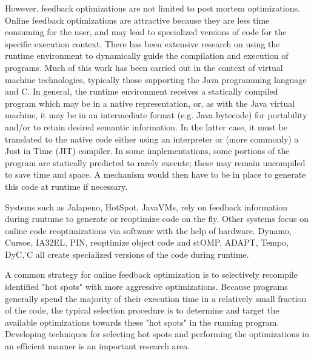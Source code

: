 However, feedback optimizations are not limited to post mortem
optimizations.
Online feedback optimizations are attractive because they are less time consuming for the user, and may lead to specialized versions of code for the specific execution context.
There has been extensive research on using the runtime environment to
dynamically guide the compilation and execution of programs. Much of this work
has been carried out in the context of virtual machine technologies, typically
those supporting the Java programming language and C.  In general, the runtime
environment receives a statically compiled program which may be in a native
representation, or, as with the Java virtual machine, it may be in an
intermediate format (e.g. Java bytecode) for portability and/or to retain
desired semantic information.  In the latter case, it must be translated to
the native code either using an interpreter or (more commonly) a Just in Time
(JIT) compiler.  In some implementations, some portions of the program are
statically predicted to rarely execute; these may remain uncompiled to save
time and space. A mechanism would then have to be in place to generate this
code at runtime if necessary.

Systems such as  Jalapeno\cite{Alpern:2000:JVM:1011388.1011400}, HotSpot, JavaVMs, rely on feedback
information during runtume to generate or reoptimize code on the fly.
Other systems focus on online code reoptimizations via software with the
help of hardware. Dynamo, Cursoe, IA32EL, PIN, reoptimize
object code and stOMP, ADAPT\cite{Voss:2001:HAP:568014.379583}, Tempo, DyC,'C all create specialized versions
of the code during runtime.

A common strategy for online feedback optimization is to selectively recompile
identified "hot spots" with more aggressive optimizations.  Because programs
generally spend the majority of their execution time in a relatively small
fraction of the code, the typical selection procedure is to determine and
target the available optimizations towards these "hot spots" in the running
program.  Developing techniques for selecting hot spots and performing the
optimizations in an efficient manner is an important research area.


